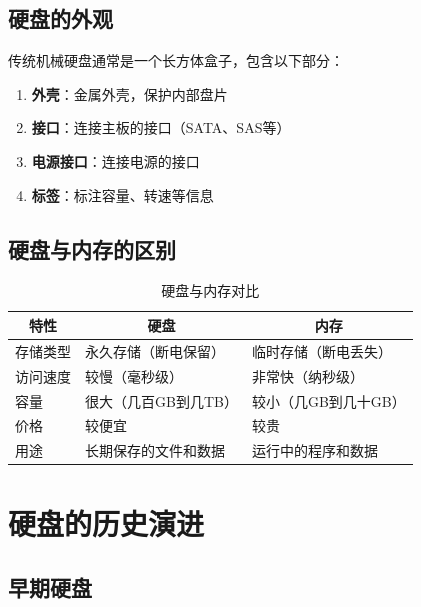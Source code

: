\documentclass[12pt,UTF8]{ctexbook}
\begin{document}
\section{硬盘的外观}

传统机械硬盘通常是一个长方体盒子，包含以下部分：

\begin{enumerate}
    \item \textbf{外壳}：金属外壳，保护内部盘片
    \item \textbf{接口}：连接主板的接口（SATA、SAS等）
    \item \textbf{电源接口}：连接电源的接口
    \item \textbf{标签}：标注容量、转速等信息
\end{enumerate}

\section{硬盘与内存的区别}

\begin{table}[H]
    \centering
    \begin{tabularx}{\textwidth}{|p{4cm}|X|X|}
        \hline
        \multicolumn{1}{|c|}{\textbf{特性}} & \multicolumn{1}{c|}{\textbf{硬盘}} & \multicolumn{1}{c|}{\textbf{内存}} \\
        \hline
        存储类型 & 永久存储（断电保留） & 临时存储（断电丢失） \\
        \hline
        访问速度 & 较慢（毫秒级） & 非常快（纳秒级） \\
        \hline
        容量 & 很大（几百GB到几TB） & 较小（几GB到几十GB） \\
        \hline
        价格 & 较便宜 & 较贵 \\
        \hline
        用途 & 长期保存的文件和数据 & 运行中的程序和数据 \\
        \hline
    \end{tabularx}
    \caption{硬盘与内存对比}
    \label{tab:hdd_vs_ram}
\end{table}

\chapter{硬盘的历史演进}

\section{早期硬盘}
\end{document}
